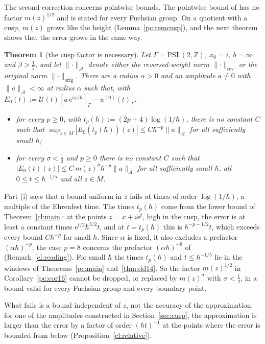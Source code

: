 \documentclass[twoside,10pt]{article}
\numberwithin{equation}{section}
\theoremstyle{slbody}
\newtheorem{theorem}[equation]{Theorem}
\theoremstyle{remark}
\newcommand{\norm}[1]{\lVert #1\rVert}
\newcommand{\ue}{\mathrm{e}}
\newcommand{\cU}{\mathcal{U}}
\newcommand{\pcNorm}[1]{\norm{#1}_{\mathrm{orig}}}
\newcommand{\swNorm}[1]{\norm{#1}_{\mathrm{rev}}}
\begin{document}
The second correction concerns pointwise bounds. The pointwise bound of \cite[Corollary~1.6]{S} has no factor
$m(z)^{1/2}$ and is stated for every Fuchsian group. On a quotient with a cusp, $m(z)$ grows like the height
(Lemma~\ref{pc:remcusp}), and the next theorem shows that the error grows in the same way.

\begin{theorem}[the cusp factor is necessary]\label{cl:necessary}
Let $\Gamma=\mathrm{PSL}(2,\mathbb Z)$, $x_0=i$, $b=\infty$ and $\beta>\tfrac12$, and let $\norm{\cdot}_{\mathcal A}$ denote either the
reversed-weight norm $\swNorm\cdot$ or the original norm $\pcNorm\cdot$. There are a radius $\alpha>0$ and an amplitude $a\ne0$ with
$\norm a_{\mathcal A}<\infty$ at radius $\alpha$ such that, with $E_0(t):=\cU(t)[a\,\ue^{i\varphi/\hbar}]_\Gamma-u^{(0)}(t)_\Gamma$:
\begin{itemize}
\item[\textup{(i)}] for every $p\ge0$, with $t_p(\hbar):=(2p+4)\log(1/\hbar)$, there is no constant $C$ such that
$\sup_{z\in M}|E_0(t_p(\hbar))(z)|\le C\hbar^{-p}\norm a_{\mathcal A}$ for all sufficiently small $\hbar$;
\item[\textup{(ii)}] for every $\sigma<\tfrac12$ and $p\ge0$ there is no constant $C$ such that
$|E_0(t)(z)|\le C\,m(z)^{\sigma}\hbar^{-p}\norm a_{\mathcal A}$ for all sufficiently small $\hbar$, all $0\le t\le\hbar^{-1/5}$ and
all $z\in M$.
\end{itemize}
\end{theorem}

Part (i) says that a bound uniform in $z$ fails at times of order $\log(1/\hbar)$, a multiple of the Ehrenfest time.
The times $t_p(\hbar)$ come from the lower bound of Theorem~\ref{cl:main}: at the points $z=x+i\ue^t$, high in the cusp, the error is
at least a constant times $\ue^{t/2}\hbar^{3/2}t$, and at $t=t_p(\hbar)$ this is $\hbar^{-p-1/2}t$, which exceeds every bound $C\hbar^{-p}$
for small $\hbar$.
Since $\alpha$ is fixed, it also excludes a prefactor $(\alpha\hbar)^{-p}$; the case $p=8$ concerns the prefactor
$(\alpha\hbar)^{-8}$ of \cite[Corollary~1.6]{S} (Remark~\ref{cl:reading}). For small $\hbar$ the times $t_p(\hbar)$ and
$t\le\hbar^{-1/5}$ lie in the windows of Theorems~\ref{pc:main} and~\ref{thm:dd14}. So the factor
$m(z)^{1/2}$ in Corollary~\ref{pc:cor16} cannot be dropped, or replaced by $m(z)^\sigma$ with $\sigma<\tfrac12$, in a bound valid
for every Fuchsian group and every boundary point.

What fails is a bound independent of $z$, not the accuracy of the approximation: for one of the amplitudes constructed in
Section~\ref{sec:cusp}, the approximation is larger than the error by a factor of order $(\hbar t)^{-1}$ at the points where
the error is bounded from below (Proposition~\ref{cl:relative}).
\end{document}
